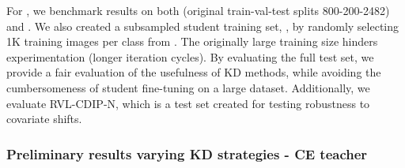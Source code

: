 For \DC{}, we benchmark results on both \tobacco{} (original train-val-test splits 800-200-2482) and \rvl.  
We also created a subsampled student training set, \rvlone, by randomly selecting 1K training images per class from \rvl. The originally large training size hinders experimentation (longer iteration cycles).
By evaluating the full \rvl{} test set, we provide a fair evaluation of the usefulness of KD methods, while avoiding the cumbersomeness of student fine-tuning on a large dataset. Additionally, we evaluate RVL-CDIP-N, which is a test set created for testing robustness to covariate shifts.




\subsubsection{Preliminary results varying KD strategies - CE teacher}

